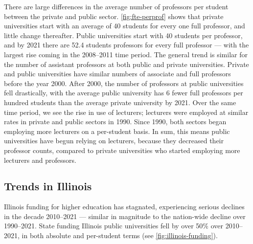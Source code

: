There are large differences in the average number of professors per student between the private and public sector.
\autoref{fig:fte-perprof} shows that private universities start with an average of 40 students for every one full professor, and little change thereafter.
Public universities start with 40 students per professor, and by 2021 there are 52.4 students professors for every full professor --- with the largest rise coming in the 2008--2011 time period.
The general trend is similar for the number of assistant professors at both public and private universities.
Private and public universities have similar numbers of associate and full professors before the year 2000.
After 2000, the number of professors at public universities fell drastically, with the average public university has 6 fewer full professors per hundred students than the average private university by 2021.
Over the same time period, we see the rise in use of lecturers; lecturers were employed at similar rates in private and public sectors in 1990.
Since 1990, both sectors began employing more lecturers on a per-student basis.
In sum, this means public universities have begun relying on lecturers, because they decreased their professor counts, compared to private universities who started employing more lecturers and professors.

\subsection{Trends in Illinois}
\label{sec:trends-illinois}
Illinois funding for higher education has stagnated, experiencing serious declines in the decade 2010--2021 --- similar in magnitude to the nation-wide decline over 1990--2021.
State funding Illinois public universities fell by over 50\% over 2010--2021, in both absolute and per-student terms (see \autoref{fig:illinois-funding}).

